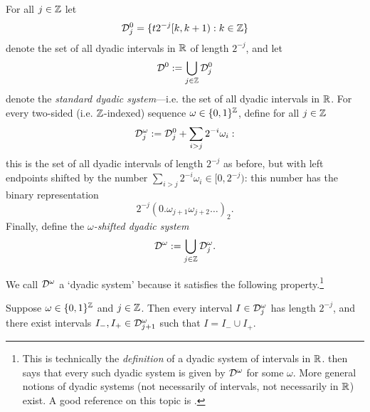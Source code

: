 \begin{defn}
  For all $j \in \mathbb{Z}$ let
  \begin{equation*}
    \mathcal{D}_{j}^{0} = \{t2^{-j}[k, k+1) : k \in \mathbb{Z}\}
  \end{equation*}
  denote the set of all dyadic intervals in $\mathbb{R}$ of length $2^{-j}$, and let
  \begin{equation*}
    \mathcal{D}^{0} := \bigcup_{j \in \mathbb{Z}} \mathcal{D}_{j}^{0}
  \end{equation*}
  denote the \emph{standard dyadic system}---i.e. the set of all dyadic intervals in $\mathbb{R}$.
  For every two-sided (i.e. $\mathbb{Z}$-indexed) sequence $\omega \in \{0,1\}^{\mathbb{Z}}$, define for all $j \in \mathbb{Z}$
  \begin{equation*}
    \mathcal{D}_{j}^{\omega} := \mathcal{D}_{j}^{0} + \sum_{i > j} 2^{-i} \omega_{i}:
  \end{equation*}
  this is the set of all dyadic intervals of length $2^{-j}$ as before, but with left endpoints shifted by the number $\sum_{i > j} 2^{-i} \omega_{i} \in [0,2^{-j})$: this number has the binary representation
  \begin{equation*}
    2^{-j}(0.\omega_{j+1}\omega_{j+2}\ldots)_{2} .
  \end{equation*}
  Finally, define the \emph{$\omega$-shifted dyadic system}
  \begin{equation*}
   \mathcal{D}^{\omega} := \bigcup_{j \in \mathbb{Z}} \mathcal{D}_{j}^{\omega}.
  \end{equation*}
\end{defn}

We call $\mathcal{D}^{\omega}$ a `dyadic system' because it satisfies the following property.\footnote{This is technically the \emph{definition} of a dyadic system of intervals in $\mathbb{R}$. \cite[Lemma 5.1.7]{HNVW16} then says that every such dyadic system is given by $\mathcal{D}^\omega$ for some $\omega$. More general notions of dyadic systems (not necessarily of intervals, not necessarily in $\mathbb{R}$) exist. A good reference on this topic is \cite{LN18}.}

\begin{prop}\label{prop:dyadicsystems}
  Suppose $\omega \in \{0,1\}^{\mathbb{Z}}$ and $j \in \mathbb{Z}$.
  Then every interval $I \in \mathcal{D}_{j}^{\omega}$ has length $2^{-j}$, and there exist intervals $I_{-}, I_{+} \in \mathcal{D}^{\omega}_{j+1}$ such that $I = I_{-} \cup I_{+}$.
\end{prop}


